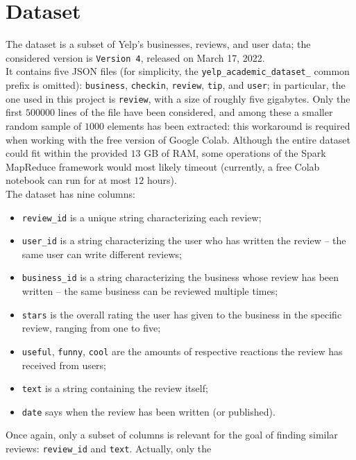 \documentclass{article}
\begin{document}
  \newpage

  \section{Dataset}
  The dataset is a subset of Yelp's businesses, reviews, and user data; the
  considered version is \texttt{Version 4}, released on March 17, 2022. \\
  It contains five JSON files (for simplicity, the
  \texttt{yelp\_academic\_dataset\_} common prefix is omitted):
  \texttt{business}, \texttt{checkin}, \texttt{review}, \texttt{tip}, and
  \texttt{user}; in particular, the one used in this project is
  \texttt{review}, with a size of roughly five gigabytes. Only the first
  \( 500000 \) lines of the file have been considered, and among these a
  smaller random sample of \( 1000 \) elements has been extracted: this
  workaround is required when working with the free version of Google Colab.
  Although the entire dataset could fit within the provided \( 13 \) GB of RAM,
  some operations of the Spark MapReduce framework would most likely timeout
  (currently, a free Colab notebook can run for at most \( 12 \) hours). \\
  The dataset has nine columns:
  \begin{itemize}
    \item \texttt{review\_id} is a unique string characterizing each review;
    \item \texttt{user\_id} is a string characterizing the user who has written
    the review – the same user can write different reviews;
    \item \texttt{business\_id} is a string characterizing the business whose
    review has been written – the same business can be reviewed multiple times;
    \item \texttt{stars} is the overall rating the user has given to the
    business in the specific review, ranging from one to five;
    \item \texttt{useful}, \texttt{funny}, \texttt{cool} are the amounts of
    respective reactions the review has received from users;
    \item \texttt{text} is a string containing the review itself;
    \item \texttt{date} says when the review has been written (or published).
  \end{itemize}
  Once again, only a subset of columns is relevant for the goal of finding
  similar reviews: \texttt{review\_id} and \texttt{text}. Actually, only the
\end{document}
